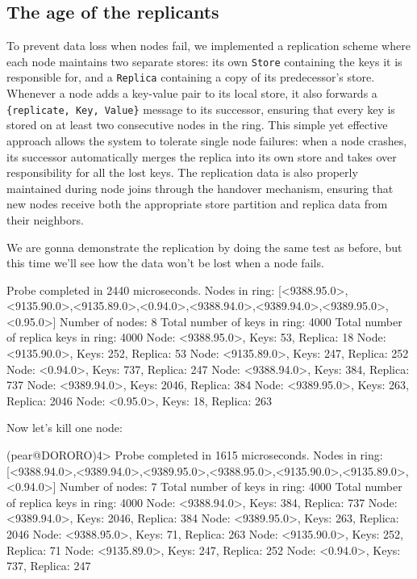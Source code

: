 \documentclass[a4paper, 11pt]{article}
\begin{document}
\subsection{The age of the replicants}
To prevent data loss when nodes fail, we implemented a replication scheme where each node maintains two separate stores: its own \texttt{Store} containing the keys it is responsible for, and a \texttt{Replica} containing a copy of its predecessor's store. Whenever a node adds a key-value pair to its local store, it also forwards a \texttt{\{replicate, Key, Value\}} message to its successor, ensuring that every key is stored on at least two consecutive nodes in the ring. This simple yet effective approach allows the system to tolerate single node failures: when a node crashes, its successor automatically merges the replica into its own store and takes over responsibility for all the lost keys. The replication data is also properly maintained during node joins through the handover mechanism, ensuring that new nodes receive both the appropriate store partition and replica data from their neighbors.

We are gonna demonstrate the replication by doing the same test as before, but this time we'll see how the data won't be lost when a node fails.

\begin{mylisting}
Probe completed in 2440 microseconds. Nodes in ring: [<9388.95.0>,<9135.90.0>,<9135.89.0>,<0.94.0>,<9388.94.0>,<9389.94.0>,<9389.95.0>,<0.95.0>]
Number of nodes: 8
Total number of keys in ring: 4000
Total number of replica keys in ring: 4000
Node: <9388.95.0>, Keys: 53, Replica: 18
Node: <9135.90.0>, Keys: 252, Replica: 53
Node: <9135.89.0>, Keys: 247, Replica: 252
Node: <0.94.0>, Keys: 737, Replica: 247
Node: <9388.94.0>, Keys: 384, Replica: 737
Node: <9389.94.0>, Keys: 2046, Replica: 384
Node: <9389.95.0>, Keys: 263, Replica: 2046
Node: <0.95.0>, Keys: 18, Replica: 263

\end{mylisting}

Now let's kill one node:

\begin{mylisting}
(pear@DORORO)4> Probe completed in 1615 microseconds. Nodes in ring: [<9388.94.0>,<9389.94.0>,<9389.95.0>,<9388.95.0>,<9135.90.0>,<9135.89.0>,<0.94.0>]
Number of nodes: 7
Total number of keys in ring: 4000
Total number of replica keys in ring: 4000
Node: <9388.94.0>, Keys: 384, Replica: 737
Node: <9389.94.0>, Keys: 2046, Replica: 384
Node: <9389.95.0>, Keys: 263, Replica: 2046
Node: <9388.95.0>, Keys: 71, Replica: 263
Node: <9135.90.0>, Keys: 252, Replica: 71
Node: <9135.89.0>, Keys: 247, Replica: 252
Node: <0.94.0>, Keys: 737, Replica: 247
\end{mylisting}
\end{document}
